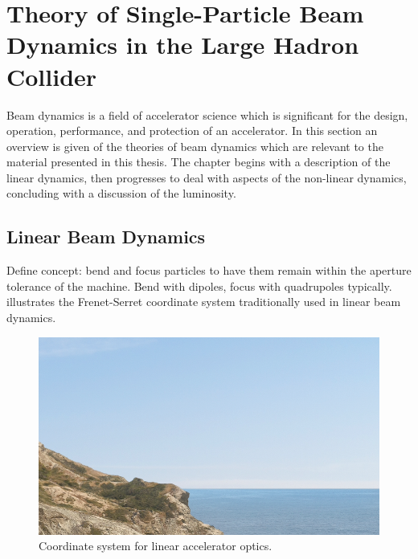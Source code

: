 
\chapter{Theory of Single-Particle Beam Dynamics in the Large Hadron Collider} %

\label{Chapter1} %


Beam dynamics is a field of accelerator science which is significant for the design, operation, performance, and protection of an accelerator. 
In this section an overview is given of the theories of beam dynamics which are relevant to the material presented in this thesis.
The chapter begins with a description of the linear dynamics, then progresses to deal with aspects of the non-linear dynamics, concluding with a discussion of the luminosity.


\section{Linear Beam Dynamics}

Define concept: bend and focus particles to have them remain within the aperture tolerance of the machine.
Bend with dipoles, focus with quadrupoles typically.
 illustrates the Frenet-Serret coordinate system traditionally used in linear beam dynamics.
\bigbreak

\begin{figure}[!htb]
    \begin{center}
    \includegraphics[width = 0.7\linewidth]{Figures/placeholder.png}
    \caption{Coordinate system for linear accelerator optics.}
    \label{fig:frenet_system}
    \end{center}
\end{figure}

